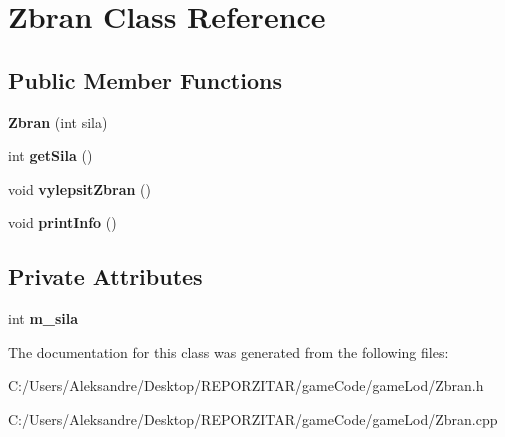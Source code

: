 \hypertarget{class_zbran}{}\section{Zbran Class Reference}
\label{class_zbran}
\subsection*{Public Member Functions}
\begin{DoxyCompactItemize}
\item 
\mbox{\label{class_zbran_a06d793187452847683bb0f5bb5542fd1}} 
{\bfseries Zbran} (int sila)
\item 
\mbox{\label{class_zbran_acc58bfc8cf0ffa57f3dcd60068bc09dd}} 
int {\bfseries get\+Sila} ()
\item 
\mbox{\label{class_zbran_ab226ce4ef3e1a70517c052d3f1953af1}} 
void {\bfseries vylepsit\+Zbran} ()
\item 
\mbox{\label{class_zbran_a6185f8a200aed0c3b0396737ca16ce2a}} 
void {\bfseries print\+Info} ()
\end{DoxyCompactItemize}
\subsection*{Private Attributes}
\begin{DoxyCompactItemize}
\item 
\mbox{\label{class_zbran_af991ff10f0078033be93c6e2921b5fd3}} 
int {\bfseries m\+\_\+sila}
\end{DoxyCompactItemize}


The documentation for this class was generated from the following files\+:\begin{DoxyCompactItemize}
\item 
C\+:/\+Users/\+Aleksandre/\+Desktop/\+R\+E\+P\+O\+R\+Z\+I\+T\+A\+R/game\+Code/game\+Lod/Zbran.\+h\item 
C\+:/\+Users/\+Aleksandre/\+Desktop/\+R\+E\+P\+O\+R\+Z\+I\+T\+A\+R/game\+Code/game\+Lod/Zbran.\+cpp\end{DoxyCompactItemize}
